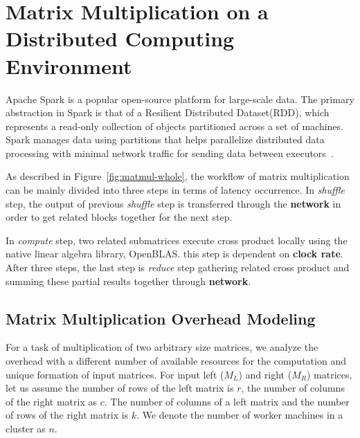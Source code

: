 \documentclass[10pt, conference, compsocconf]{IEEEtran}
\begin{document}
\section{Matrix Multiplication on a Distributed Computing Environment}\label{sec:distributed-matrix-computation}

Apache Spark is a popular open-source platform for large-scale data. The primary abstraction in Spark is that of a Resilient Distributed Dataset(RDD), which represents a read-only collection of objects partitioned across a set of machines. Spark manages data using partitions that helps parallelize distributed data processing with minimal network traffic for sending data between executors~\cite{spark}. 

As described in Figure~\ref{fig:matmul-whole}, the workflow of matrix multiplication can be mainly divided into three steps in terms of latency occurrence. In \textit{shuffle} step, the output of previous \textit{shuffle} step is transferred through the \textbf{network} in order to get related blocks together for the next step.

In \textit{compute} step, two related submatrices execute cross product locally using the native linear algebra library, OpenBLAS. this step is dependent on \textbf{clock rate}. After three steps, the last step is \textit{reduce} step gathering related cross product and summing these partial results together through \textbf{network}.

\subsection{Matrix Multiplication Overhead Modeling}
For a task of multiplication of two arbitrary size matrices, we analyze the overhead with a different number of available resources for the computation and unique formation of input matrices. For input left ($M_L$) and right ($M_R$) matrices, let us assume the number of rows of the left matrix is $r$, the number of columns of the right matrix as $c$. The number of columns of a left matrix and the number of rows of the right matrix is $k$. We denote the number of worker machines in a cluster as $n$.
\end{document}

